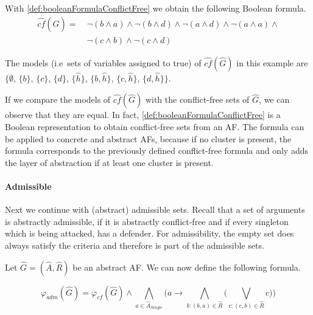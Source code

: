 \begin{example}
With \cref{def:booleanFormulaConflictFree} we obtain the following Boolean formula.
\begin{align*}
    \hat{cf}(\hat{G}) =\ &
    \lnot(b \land a)  \land
    \lnot(b \land d)  \land
    \lnot(a \land d)  \land
    \lnot(a \land a)  \land
    \\
    & \lnot(c \land b)  \land
    \lnot(c \land d)
\end{align*}

The models (i.e\ sets of variables assigned to true) of $\hat{cf}(\hat{G})$ in this example are $\bigl\{\emptyset$, $\{b\}$, $\{c\}$, $\{d\}$, $\{\hat{h}\}$, $\{b, \hat{h}\}$, $\{c, \hat{h}\}$, $\{d, \hat{h}\}\bigl\}$.
\end{example}

If we compare the models of $\hat{cf}(\hat{G})$ with the conflict-free sets of $\hat{G}$, we can observe that they are equal. In fact, \cref{def:booleanFormulaConflictFree} is a Boolean representation to obtain conflict-free sets from an AF. The formula can be applied to concrete and abstract AFs, because if no cluster is present, the formula corresponds to the previously defined conflict-free formula and only adds the layer of abstraction if at least one cluster is present.


\paragraph{Admissible} Next we continue with (abstract) admissible sets. Recall that a set of arguments is abstractly admissible, if it is abstractly conflict-free and if every singleton which is being attacked, has a defender. For admissibility, the empty set does always satisfy the criteria and therefore is part of the admissible sets.

\begin{definition}
    Let $\hat{G}=(\hat{A}, \hat{R})$ be an abstract AF. We can now define the following formula.
    \begin{center}
        \[ \varphi_{adm}(\hat{G})=
        \varphi_{cf}(\hat{G}) \land  \bigwedge_{a \in \hat{A}_{\mathit{Single}}} \big( a \rightarrow \bigwedge_{b:(b,a) \in \hat{R}} \big( \bigvee_{c:(c,b) \in \hat{R}} c\big) \big)
        \]
    \end{center}
    \label{def:booleanFormulaAdmissible}
\end{definition}


